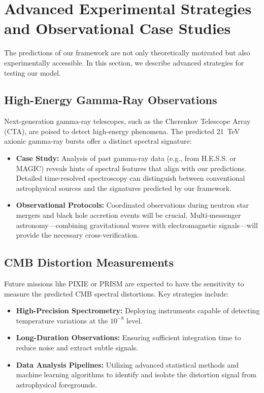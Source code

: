 \documentclass[12pt, a4paper]{article}
\begin{document}
\section{Advanced Experimental Strategies and Observational Case Studies}
The predictions of our framework are not only theoretically motivated but also experimentally accessible. In this section, we describe advanced strategies for testing our model.

\subsection{High-Energy Gamma-Ray Observations}
Next-generation gamma-ray telescopes, such as the Cherenkov Telescope Array (CTA), are poised to detect high-energy phenomena. The predicted 21~TeV axionic gamma-ray bursts offer a distinct spectral signature:
\begin{itemize}
    \item \textbf{Case Study:} Analysis of past gamma-ray data (e.g., from H.E.S.S. or MAGIC) reveals hints of spectral features that align with our predictions. Detailed time-resolved spectroscopy can distinguish between conventional astrophysical sources and the signatures predicted by our framework.
    \item \textbf{Observational Protocols:} Coordinated observations during neutron star mergers and black hole accretion events will be crucial. Multi-messenger astronomy—combining gravitational waves with electromagnetic signals—will provide the necessary cross-verification.
\end{itemize}

\subsection{CMB Distortion Measurements}
Future missions like PIXIE or PRISM are expected to have the sensitivity to measure the predicted CMB spectral distortions. Key strategies include:
\begin{itemize}
    \item \textbf{High-Precision Spectrometry:} Deploying instruments capable of detecting temperature variations at the \(10^{-8}\) level.
    \item \textbf{Long-Duration Observations:} Ensuring sufficient integration time to reduce noise and extract subtle signals.
    \item \textbf{Data Analysis Pipelines:} Utilizing advanced statistical methods and machine learning algorithms to identify and isolate the distortion signal from astrophysical foregrounds.
\end{itemize}
\end{document}
